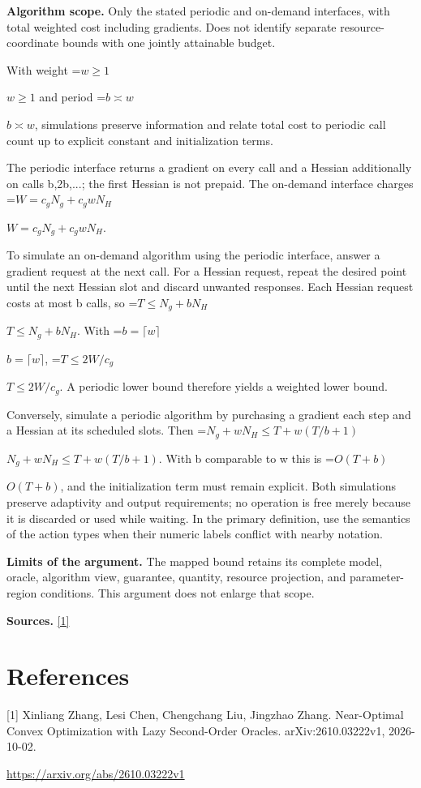 \documentclass[10pt,a4paper]{article}
\newcommand{\AtlasMath}[1]{\par\begingroup\centering\setbox0=\hbox{$\displaystyle #1$}\ifdim\wd0>1.4\linewidth\typeout{ATLAS WIDE FORMULA: \the\wd0}\fi\ifdim\wd0>\linewidth\resizebox{\linewidth}{!}{\box0}\else\box0\fi\par\endgroup}
\newcommand{\AtlasInlineMath}[1]{\begingroup\setbox0=\hbox{$#1$}\ifdim\wd0>.4\linewidth\endgroup\AtlasMath{#1}\else\endgroup$#1$\fi}
\begin{document}
\textbf{Algorithm scope.} Only the stated periodic and on-demand interfaces, with total weighted cost including gradients. Does not identify separate resource-coordinate bounds with one jointly attainable budget.

With weight \AtlasInlineMath{w\ge1} and period \AtlasInlineMath{b\asymp w}, simulations preserve information and relate total cost to periodic call count up to explicit constant and initialization terms.

The periodic interface returns a gradient on every call and a Hessian additionally on calls b,2b,...; the first Hessian is not prepaid. The on-demand interface charges \AtlasInlineMath{W=c_gN_g+c_gwN_H}.

To simulate an on-demand algorithm using the periodic interface, answer a gradient request at the next call. For a Hessian request, repeat the desired point until the next Hessian slot and discard unwanted responses. Each Hessian request costs at most b calls, so \AtlasInlineMath{T\le N_g+bN_H}. With \AtlasInlineMath{b=\lceil w\rceil}, \AtlasInlineMath{T\le2W/c_g}. A periodic lower bound therefore yields a weighted lower bound.

Conversely, simulate a periodic algorithm by purchasing a gradient each step and a Hessian at its scheduled slots. Then \AtlasInlineMath{N_g+wN_H\le T+w(T/b+1)}. With b comparable to w this is \AtlasInlineMath{O(T+b)}, and the initialization term must remain explicit. Both simulations preserve adaptivity and output requirements; no operation is free merely because it is discarded or used while waiting. In the primary definition, use the semantics of the action types when their numeric labels conflict with nearby notation.

\textbf{Limits of the argument.} The mapped bound retains its complete model, oracle, algorithm view, guarantee, quantity, resource projection, and parameter-region conditions. This argument does not enlarge that scope.

\textbf{Sources.} \href{https://arxiv.org/abs/2610.03222v1}{[1]}

\section{References}
[1] Xinliang Zhang, Lesi Chen, Chengchang Liu, Jingzhao Zhang. Near-Optimal Convex Optimization with Lazy Second-Order Oracles. arXiv:2610.03222v1, 2026-10-02.

\url{https://arxiv.org/abs/2610.03222v1}
\end{document}
